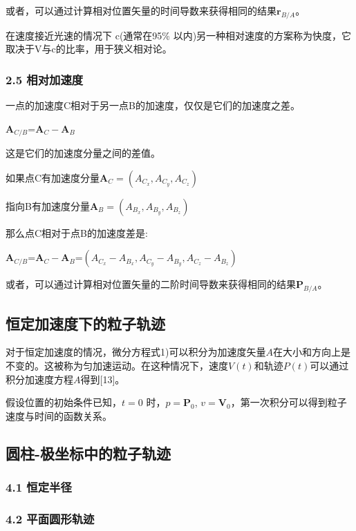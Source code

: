 或者，可以通过计算相对位置矢量的时间导数来获得相同的结果$\mathbf{r}_{B/A}$。

在速度接近光速的情况下 c(通常在95\% 以内)另一种相对速度的方案称为快度，它取决于V与c的比率，用于狭义相对论。

\subsubsection{2.5 相对加速度}

一点的加速度C相对于另一点B的加速度，仅仅是它们的加速度之差。

$\mathbf{A}_{C/B}$=$\mathbf{A}_{C}-\mathbf{A}_{B}$

这是它们的加速度分量之间的差值。


如果点C有加速度分量$\mathbf{A}_{C}=(A_{C_x},A_{C_y},A_{C_z})$

指向B有加速度分量$\mathbf{A}_{B}=(A_{B_x},A_{B_y},A_{B_z})$

那么点C相对于点B的加速度差是:

$\mathbf{A}_{C/B}$=$\mathbf{A}_{C}-\mathbf{A}_{B}$=$(A_{C_x}-A_{B_x},A_{C_y}-A_{B_y},A_{C_z}-A_{B_z})$

或者，可以通过计算相对位置矢量的二阶时间导数来获得相同的结果$\mathbf{P}_{B/A}$。

\subsection{恒定加速度下的粒子轨迹}

对于恒定加速度的情况，微分方程式1)可以积分为加速度矢量${A}$在大小和方向上是不变的。这被称为匀加速运动。在这种情况下，速度$V(t)$和轨迹$P(t)$可以通过积分加速度方程$A$得到[13]。

假设位置的初始条件已知，$t=0$ 时，$p=\mathbf{P}_0$, $v=\mathbf{V}_0$，第一次积分可以得到粒子速度与时间的函数关系。



\subsection{圆柱-极坐标中的粒子轨迹}



\subsubsection{4.1 恒定半径}



\subsubsection{4.2 平面圆形轨迹}



